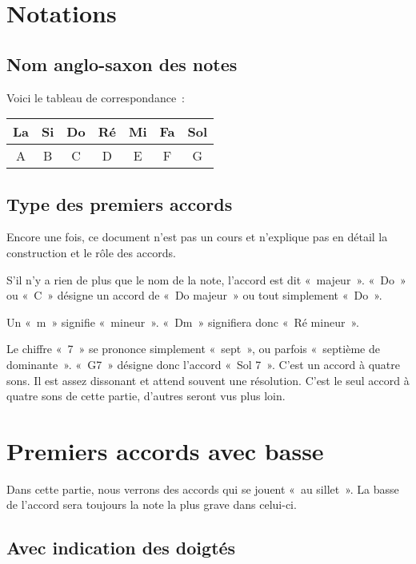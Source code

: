 \documentclass[11pt]{article}
\begin{document}
\section{Notations}

\subsection{Nom anglo-saxon des notes}

Voici le tableau de correspondance~:

\begin{tabular}{ | c | c | c | c | c | c | c | }
    \hline
    La & Si & Do & Ré & Mi & Fa & Sol \\
    \hline
    A & B & C & D & E & F & G \\
    \hline
\end{tabular}

\subsection{Type des premiers accords}

Encore une fois, ce document n’est pas un cours et n’explique pas en détail
la construction et le rôle des accords.

S’il n’y a rien de plus que le nom de la note, l’accord est dit «~majeur~».
«~Do~» ou «~C~» désigne un accord de «~Do majeur~» ou tout simplement «~Do~».

Un «~m~» signifie «~mineur~». «~Dm~» signifiera donc «~Ré mineur~».

Le chiffre «~7~» se prononce simplement «~sept~», ou parfois «~septième de
dominante~». «~G7~» désigne donc l’accord «~Sol 7~».
C’est un accord à quatre sons. Il est assez dissonant et
attend souvent une résolution. C’est le seul accord à quatre sons de cette
partie, d’autres seront vus plus loin.

\section{Premiers accords avec basse}

Dans cette partie, nous verrons des accords qui se jouent «~au sillet~».
La basse de l’accord sera toujours la note la plus grave dans celui-ci.

\subsection{Avec indication des doigtés}
\end{document}
